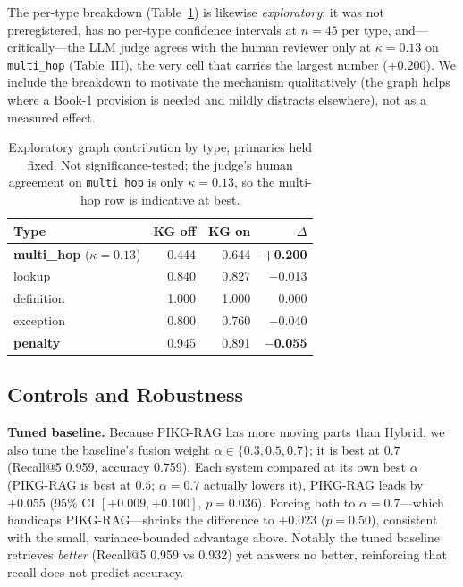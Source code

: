 \documentclass[conference]{IEEEtran}
\begin{document}
The per-type breakdown (Table~\ref{tab:pertype}) is likewise \emph{exploratory}: it was not
preregistered, has no per-type confidence intervals at $n=45$ per type, and---critically---the LLM
judge agrees with the human reviewer only at $\kappa=0.13$ on \texttt{multi\_hop} (Table~III), the
very cell that carries the largest number ($+0.200$). We include the breakdown to motivate the
mechanism qualitatively (the graph helps where a Book-1 provision is needed and mildly distracts
elsewhere), not as a measured effect.

\begin{table}[t]
\caption{Exploratory graph contribution by type, primaries held fixed. Not significance-tested; the
judge's human agreement on \texttt{multi\_hop} is only $\kappa=0.13$, so the multi-hop row is
indicative at best.}
\label{tab:pertype}
\centering
\small
\begin{tabular}{@{}lrrr@{}}
\hline
\textbf{Type} & \textbf{KG off} & \textbf{KG on} & $\Delta$ \\
\hline
\textbf{multi\_hop} ($\kappa{=}0.13$) & 0.444 & 0.644 & \textbf{+0.200} \\
lookup & 0.840 & 0.827 & $-$0.013 \\
definition & 1.000 & 1.000 & 0.000 \\
exception & 0.800 & 0.760 & $-$0.040 \\
\textbf{penalty} & 0.945 & 0.891 & \textbf{$-$0.055} \\
\hline
\end{tabular}
\end{table}

\subsection{Controls and Robustness}
\label{sec:controls}

\textbf{Tuned baseline.} Because PIKG-RAG has more moving parts than Hybrid, we also tune the
baseline's fusion weight $\alpha\in\{0.3,0.5,0.7\}$; it is best at $0.7$ (Recall@5 0.959, accuracy
0.759). Each system compared at its own best $\alpha$ (PIKG-RAG is best at $0.5$; $\alpha=0.7$
actually lowers it), PIKG-RAG leads by $+0.055$ (95\% CI $[+0.009,+0.100]$, $p=0.036$). Forcing both
to $\alpha=0.7$---which handicaps PIKG-RAG---shrinks the difference to $+0.023$ ($p=0.50$), consistent
with the small, variance-bounded advantage above. Notably the tuned baseline retrieves \emph{better}
(Recall@5 0.959 vs 0.932) yet answers no better, reinforcing that recall does not predict accuracy.
\end{document}
